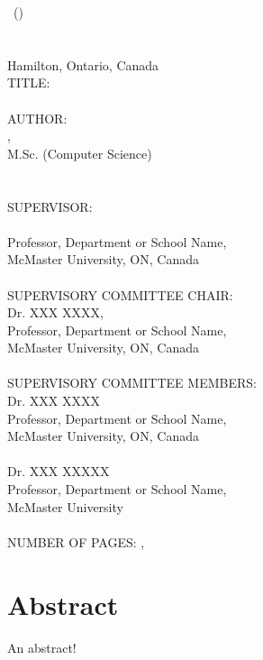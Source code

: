 \documentclass[
11pt, %
oneside, %
english, %
onehalfspacing, %
]{McMasterThesis} %
\begin{document}
\noindent %
\degreename\, (\the\year) \\
\deptname \\
\univname \\ 
Hamilton, Ontario, Canada \\[1.5cm]
TITLE: \ttitle 
\\ \\
AUTHOR:\\ \authorname, \\
M.Sc. (Computer Science)\,\\  %
\\ \\
SUPERVISOR:\\ 
\supname\,\\
Professor, Department or School Name, \\
McMaster University, ON, Canada
\\ 
\\
SUPERVISORY COMMITTEE CHAIR: \\ 
Dr. XXX XXXX,\\
Professor, Department or School Name, \\
McMaster University, ON, Canada
\\
\\
SUPERVISORY COMMITTEE MEMBERS: \\Dr. XXX XXXX\\ 
Professor, Department or School Name, \\
McMaster University, ON, Canada
\\
\\
Dr. XXX XXXXX\\ 
Professor, Department or School Name, \\
McMaster University  
\\
\\
NUMBER OF PAGES: \pageref{lastoffront}, \pageref{LastPage}  %

\clearpage




\section*{\Huge Abstract} 
An abstract! 
\clearpage
\end{document}
